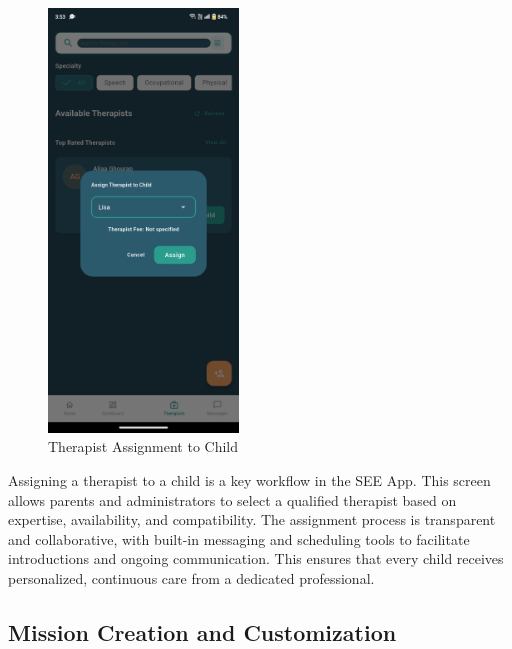 \documentclass[12pt,a4paper]{article}
\newcommand{\sectiontitle}[1]{\subsection{#1}}
\begin{document}
\begin{figure}[H]
    \centering
    \includegraphics[width=0.45\textwidth]{Screenshots/therapistassignmenttochild.png}
    \caption{Therapist Assignment to Child}
    \label{fig:therapist-assignment}
\end{figure}
Assigning a therapist to a child is a key workflow in the SEE App. This screen allows parents and administrators to select a qualified therapist based on expertise, availability, and compatibility. The assignment process is transparent and collaborative, with built-in messaging and scheduling tools to facilitate introductions and ongoing communication. This ensures that every child receives personalized, continuous care from a dedicated professional.

\sectiontitle{Mission Creation and Customization}
\end{document}
